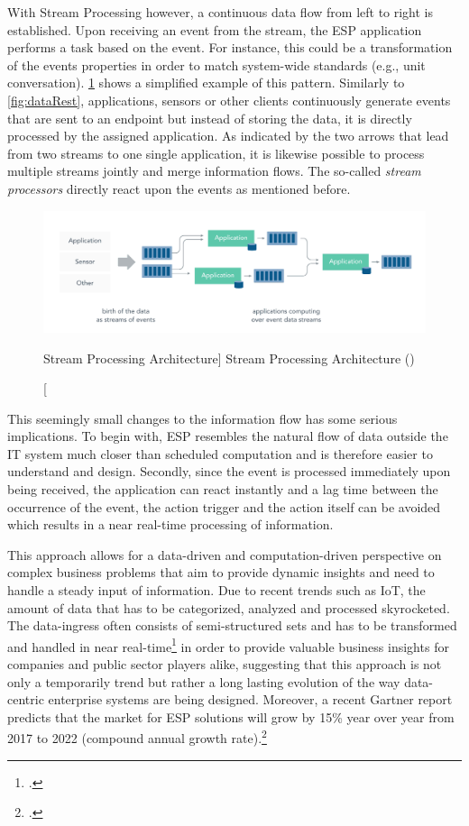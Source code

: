 With Stream Processing however, a continuous data flow from left to right is established. Upon receiving an event from the stream, the \acf{ESP} application performs a task based on the event. For instance, this could be a transformation of the events properties in order to match system-wide standards (e.g., unit conversation). 
\ref{fig:dataStream} shows a simplified example of this pattern. Similarly to \ref{fig:dataRest}, applications, sensors or other clients continuously generate events that are sent to an endpoint but instead of storing the data, it is directly processed by the assigned application. As indicated by the two arrows that lead from two streams to one single application, it is likewise possible to process multiple streams jointly and merge information flows. The so-called \textit{stream processors} directly react upon the events as mentioned before. 

\begin{figure}[ht]
    \includegraphics[width=\linewidth]{images/streaming/streming_data.png}\centering
    \caption
    [Stream Processing Architecture]
    {Stream Processing Architecture (\cite{dataArtisansWhatProcessing})}
    \label{fig:dataStream}
\end{figure}

This seemingly small changes to the information flow has some serious implications. To begin with, \acf{ESP} resembles the natural flow of data outside the IT system much closer than scheduled computation and is therefore easier to understand and design. Secondly, since the event is processed immediately upon being received, the application can react instantly and a lag time between the occurrence of the event, the action trigger and the action itself can be avoided which results in a near real-time processing of information. 

This approach allows for a data-driven and computation-driven perspective on complex business problems that aim to provide dynamic insights and need to handle a steady input of information. 
Due to recent trends such as IoT, the amount of data that has to be categorized, analyzed and processed skyrocketed. The data-ingress often consists of semi-structured sets and has to be transformed and handled in near real-time\footcite{Dekate2017PredictsInfrastructure} in order to provide valuable business insights for companies and public sector players alike, suggesting that this approach is not only a temporarily trend but rather a long lasting evolution of the way data-centric enterprise systems are being designed. Moreover, a recent Gartner report predicts that the market for \acf{ESP} solutions will grow by 15\% year over year from 2017 to 2022 (compound annual growth rate).\footcite{Heudecker2017MarketProcessing} 

